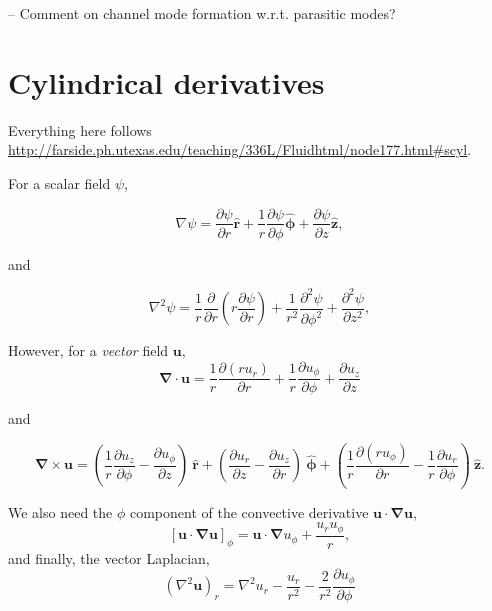 \documentclass{paper}
\newcommand{\uphi}{\ensuremath{u_\phi}}
\newcommand{\rhat}{\ensuremath{\mathbf{\hat{r}}}}
\newcommand{\phihat}{\ensuremath{\mathbf{\hat{\phi}}}}
\newcommand{\zhat}{\ensuremath{\mathbf{\hat{z}}}}
\begin{document}
-- Comment on channel mode formation w.r.t. parasitic modes?

\appendix

\section{Cylindrical derivatives}
\label{sec:cylindrical_deriv}

Everything here follows \url{http://farside.ph.utexas.edu/teaching/336L/Fluidhtml/node177.html#scyl}.

For a scalar field $\psi$, 

\begin{equation}
  \label{eq:del_scalar}
  \nabla \psi = \frac{\partial \psi}{\partial r} \rhat + \frac{1}{r} \frac{\partial \psi}{\partial \phi} \phihat + \frac{\partial \psi}{\partial z} \zhat,
\end{equation}

and

\begin{equation}
  \label{eq:del2_scalar}
  \nabla^2 \psi = \frac{1}{r} \frac{\partial}{\partial r}\left(r \frac{\partial \psi}{\partial r} \right) + \frac{1}{r^2} \frac{\partial^2 \psi}{\partial \phi^2} + \frac{\partial^2 \psi}{\partial z^2},
\end{equation}

However, for a \emph{vector} field $\mathbf{u}$,
\begin{equation}
  \label{eq:div}
  \mathbf{\nabla \cdot u} = \frac{1}{r} \frac{\partial (r u_r)}{\partial r} + \frac{1}{r} \frac{\partial \uphi}{\partial \phi}  + \frac{\partial u_z}{\partial z}
\end{equation}

and 

\begin{equation}
  \label{eq:curl}
  \mathbf{\nabla \times u} = \left( \frac{1}{r} \frac{\partial u_z}{\partial \phi} - \frac{\partial u_\phi}{\partial z}\right)\ \rhat + \left(\frac{\partial u_r}{\partial z} - \frac{\partial u_z}{\partial r}\right)\ \phihat  + \left( \frac{1}{r} \frac{\partial (r \uphi)}{\partial r} - \frac{1}{r}\frac{\partial u_r}{\partial \phi}\right)\ \zhat.
\end{equation}

We also need the $\phi$ component of the convective derivative $\mathbf{u \cdot \nabla u}$,
\begin{equation}
  \label{eq:convective_deriv_phi}
  \left[\mathbf{u \cdot \nabla u} \right]_\phi = \mathbf{u \cdot \nabla} \uphi + \frac{ u_r \uphi}{r},
\end{equation}
and finally, the vector Laplacian,
\begin{equation}
  \label{eq:vec_lap_r}
  (\nabla^2 \mathbf{u})_r = \nabla^2 u_r - \frac{u_r}{r^2} - \frac{2}{r^2} \frac{\partial \uphi}{\partial \phi}
\end{equation}
\end{document}
